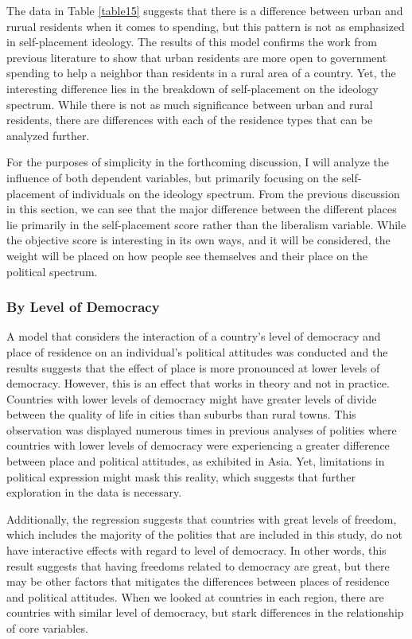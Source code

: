 \documentclass[12pt, titlepage]{article}
\begin{document}
The data in Table \ref{table15} suggests that there is a difference between urban and rurual residents when it comes to spending, but this pattern is not as emphasized in self-placement ideology. The results of this model confirms the work from previous literature to show that urban residents are more open to government spending to help a neighbor than residents in a rural area of a country. Yet, the interesting difference lies in the breakdown of self-placement on the ideology spectrum. While there is not as much significance between urban and rural residents, there are differences with each of the residence types that can be analyzed further.

For the purposes of simplicity in the forthcoming discussion, I will analyze the influence of both dependent variables, but primarily focusing on the self-placement of individuals on the ideology spectrum. From the previous discussion in this section, we can see that the major difference between the different places lie primarily in the self-placement score rather than the liberalism variable. While the objective score is interesting in its own ways, and it will be considered, the weight will be placed on how people see themselves and their place on the political spectrum. 

\subsubsection{By Level of Democracy}

A model that considers the interaction of a country's level of democracy and place of residence on an individual's political attitudes was conducted and the results suggests that the effect of place is more pronounced at lower levels of democracy. However, this is an effect that works in theory and not in practice. Countries with lower levels of democracy might have greater levels of divide between the quality of life in cities than suburbs than rural towns. This observation was displayed numerous times in previous analyses of polities where countries with lower levels of democracy were experiencing a greater difference between place and political attitudes, as exhibited in Asia. Yet, limitations in political expression might mask this reality, which suggests that further exploration in the data is necessary. 

Additionally, the regression suggests that countries with great levels of freedom, which includes the majority of the polities that are included in this study, do not have interactive effects with regard to level of democracy. In other words, this result suggests that having freedoms related to democracy are great, but there may be other factors that mitigates the differences between places of residence and political attitudes. When we looked at countries in each region, there are countries with similar level of democracy, but stark differences in the relationship of core variables.
\end{document}
